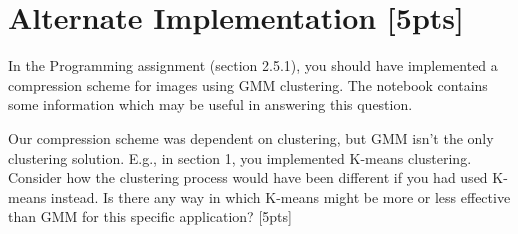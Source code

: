\section{Alternate Implementation [5pts]}
In the Programming assignment (section 2.5.1), you should have implemented a compression scheme for images using GMM clustering. The notebook contains some information which may be useful in answering this question.

\bigskip Our compression scheme was dependent on clustering, but GMM isn't the only clustering solution. E.g., in section 1, you implemented K-means clustering. Consider how the clustering process would have been different if you had used K-means instead. Is there any way in which K-means might be more or less effective than GMM for this specific application? [5pts]

\newpage